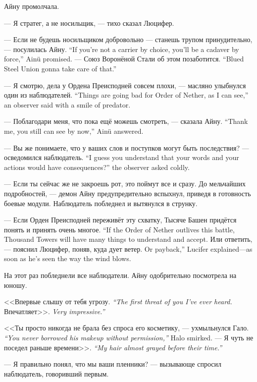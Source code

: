 Айну промолчала.

--- Я стратег, а не носильщик, --- тихо сказал Люцифер.

{--- Если не будешь носильщиком добровольно --- станешь трупом принудительно, --- посулилась Айну.}
{``If you're not a carrier by choice, you'll be a cadaver by force,'' Ain\"{u} promised.}
{--- Союз Воронёной Стали об этом позаботится.}
{``Blued Steel Union gonna take care of that.''}

{--- Я смотрю, дела у Ордена Преисподней совсем плохи, --- масляно улыбнулся один из наблюдателей.}
{``Things are going bad for Order of Nether, as I can see,'' an observer said with a smile of predator.}

{--- Поблагодари меня, что пока ещё можешь смотреть, --- сказала Айну.}
{``Thank me, you still can see by now,'' Ain\"{u} answered.}

{--- Вы же понимаете, что у ваших слов и поступков могут быть последствия? --- осведомился наблюдатель.}
{``I guess you understand that your words and your actions would have consequences?'' the observer asked coldly.}

--- Если ты сейчас же не закроешь рот, это поймут все и сразу.
До мельчайших подробностей, --- демон Айну предупредительно вспыхнул, приведя в готовность боевые модули.
Наблюдатель побледнел и вытянулся в струнку.

{--- Если Орден Преисподней переживёт эту схватку, Тысяче Башен придётся понять и принять очень многое.}
{``If the Order of Nether outlives this battle, Thousand Towers will have many things to understand and accept.}
{Или ответить, --- пояснил Люцифер, поняв, куда дует ветер.}
{Or payback,'' Lucifer explained---as soon as he's seen the way the wind blows.}

На этот раз побледнели все наблюдатели.
Айну одобрительно посмотрела на юношу.

{<<Впервые слышу от тебя угрозу.}
{\emph{``The first threat of you I've ever heard.}}
{Впечатляет>>.}
{\emph{Very impressive.''}}

{<<Ты просто никогда не брала без спроса его косметику, --- ухмыльнулся Гало.}
{\emph{``You never borrowed his makeup without permission,''} Halo smirked.}
{--- Я чуть не поседел раньше времени>>.}
{\emph{``My hair almost grayed before their time.''}}

--- Я правильно понял, что мы ваши пленники? --- вызывающе спросил наблюдатель, говоривший первым.

